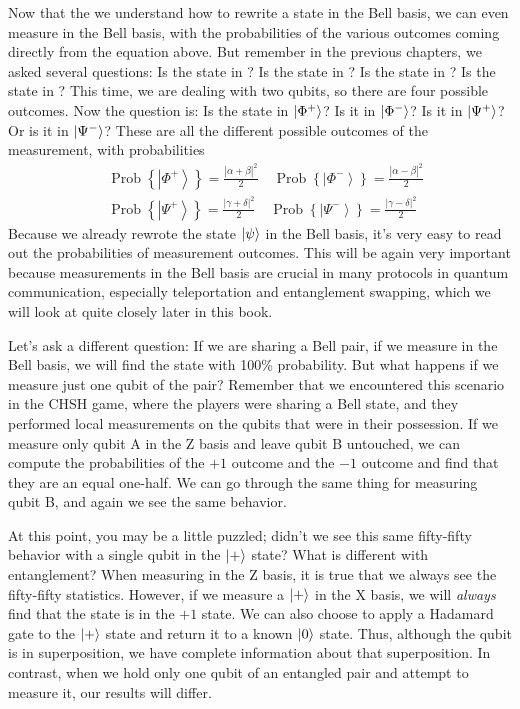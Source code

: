 Now that the we understand how to rewrite a state in the Bell basis, we can even measure in the Bell basis, with the probabilities of the various outcomes coming directly from the equation above. But remember in the previous chapters, we asked several questions: Is the state in ? Is the state in ? Is the state in \ket{+}? Is the state in \ket{-}?  This time, we are dealing with two qubits, so there are four possible outcomes. Now the question is: Is the state in $\left| \Phi^+ \right\rangle$? Is it in $\left| \Phi^- \right\rangle$? Is it in $\left| \Psi^+ \right\rangle$? Or is it in $\left| \Psi^- \right\rangle$? These are all the different possible outcomes of the measurement, with probabilities
\begin{equation}
\begin{aligned}
&\operatorname{Prob}\left\{\left|\Phi^{+}\right\rangle\right\}=\frac{|\alpha+\beta|^{2}}{2} \quad \operatorname{Prob}\left\{\left|\Phi^{-}\right\rangle\right\}=\frac{|\alpha-\beta|^{2}}{2} \\
&\operatorname{Prob}\left\{\left|\Psi^{+}\right\rangle\right\}=\frac{|\gamma+\delta|^{2}}{2} \quad \operatorname{Prob}\left\{\left|\Psi^{-}\right\rangle\right\}=\frac{|\gamma-\delta|^{2}}{2}
\end{aligned}
\end{equation}
Because we already rewrote the state $\left| \psi \right\rangle$ in the Bell basis, it's very easy to read out the probabilities of measurement outcomes.
This will be again very important because measurements in the Bell basis are crucial in many protocols in quantum communication, especially teleportation and entanglement swapping, which we will look at quite closely later in this book.

Let's ask a different question: If we are sharing a \ket{\Phi^+} Bell pair, if we measure in the Bell basis, we will find the state \ket{\Phi^+} with 100\% probability. But what happens if we measure just one qubit of the pair? Remember that we encountered this scenario in the CHSH game, where the players were sharing a Bell state, and they performed local measurements on the qubits that were in their possession. 
If we measure only qubit A in the Z basis and leave qubit B untouched, we can compute the probabilities of the $+1$ outcome and the $-1$ outcome and find that they are an equal one-half.   We can go through the same thing for measuring qubit B, and again we see the same behavior.

\label{page:plus-is-pure}
At this point, you may be a little puzzled; didn't we see this same fifty-fifty behavior with a single qubit in the $\left| + \right\rangle$ state?  What is different with entanglement?  When measuring in the Z basis, it is true that we always see the fifty-fifty statistics.  However, if we measure a $\left| + \right\rangle$ in the X basis, we will \emph{always} find that the state is in the $+1$ state.  We can also choose to apply a Hadamard gate to the $\left| + \right\rangle$ state and return it to a known $\left| 0 \right\rangle$ state.  Thus, although the qubit is in superposition, we have complete information about that superposition.  In contrast, when we hold only one qubit of an entangled pair and attempt to measure it, our results will differ.

